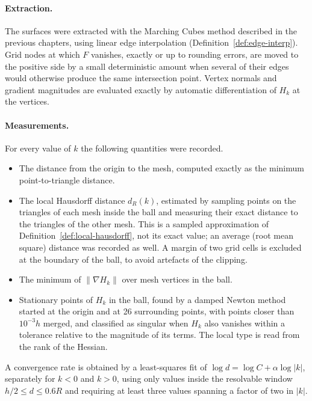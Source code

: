 \documentclass[12pt, a4paper, oneside]{book}
\theoremstyle{plain}
\theoremstyle{definition}
\theoremstyle{remark}
\begin{document}
\paragraph{Extraction.}
The surfaces were extracted with the Marching Cubes method described in the
previous chapters, using linear edge interpolation
(Definition~\ref{def:edge-interp}). Grid nodes at which $F$
vanishes, exactly or up to rounding errors, are moved to the positive side by a
small deterministic amount when several of their edges would otherwise produce
the same intersection point. Vertex normals and gradient magnitudes are
evaluated exactly by automatic differentiation of $H_k$ at the vertices.

\paragraph{Measurements.}
For every value of $k$ the following quantities were recorded.
\begin{itemize}
    \item The distance from the origin to the mesh, computed exactly as the
          minimum point-to-triangle distance.
    \item The local Hausdorff distance $d_R(k)$, estimated by sampling points on
          the triangles of each mesh inside the ball and measuring their exact
          distance to the triangles of the other mesh. This is a sampled
          approximation of Definition~\ref{def:local-hausdorff}, not its exact
          value; an average (root mean square) distance was recorded as well.
          A margin of two grid cells is excluded at the boundary of the ball,
          to avoid artefacts of the clipping.
    \item The minimum of $\|\nabla H_k\|$ over mesh vertices in the ball.
    \item Stationary points of $H_k$ in the ball, found by a damped Newton
          method started at the origin and at 26 surrounding points, with points closer than $10^{-3}h$
          merged, and classified as singular when $H_k$ also vanishes within a
          tolerance relative to the magnitude of its terms. The local type is
          read from the rank of the Hessian.
\end{itemize}
A convergence rate is obtained by a least-squares fit of
$\log d=\log C+\alpha\log|k|$, separately for $k<0$ and $k>0$, using only values
inside the resolvable window $h/2\le d\le0.6R$ and requiring at least three
values spanning a factor of two in $|k|$.
\end{document}

